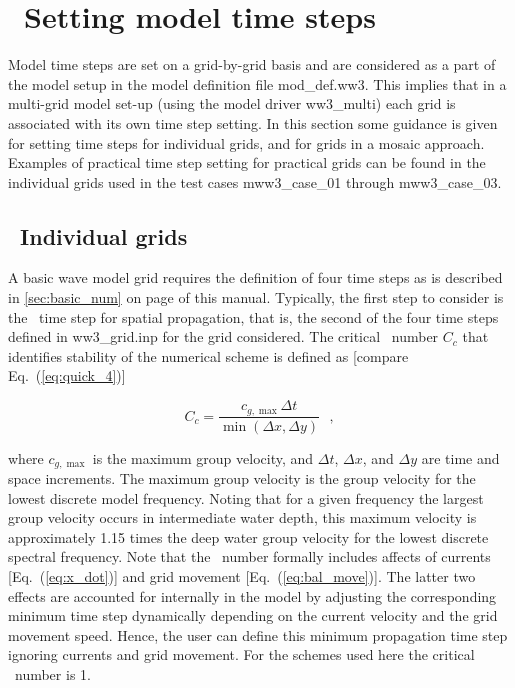 \pagestyle{myheadings} \setcounter{page}{1} \setcounter{footnote}{0}

\section{~Setting model time steps} \label{app:tstep}
\newcounters 
\vssub

Model time steps are set on a grid-by-grid basis and are considered as a part
of the model setup in the model definition file {\file mod\_def.ww3}. This
implies that in a multi-grid model set-up (using the model driver {\file
ww3\_multi}) each grid is associated with its own time step setting. In this
section some guidance is given for setting time steps for individual grids,
and for grids in a mosaic approach.  Examples of practical time step setting
for practical grids can be found in the individual grids used in the test
cases {\file mww3\_case\_01} through {\file mww3\_case\_03}.

\subsection{~Individual grids}

A basic wave model grid requires the definition of four time steps as is
described in \para\ref{sec:basic_num} on page \pageref{dt_list} of this
manual. Typically, the first step to consider is the \cfl\ time step for
spatial propagation, that is, the second of the four time steps defined in
{\file ww3\_grid.inp} for the grid considered. The critical \cfl\ number $C_c$
that identifies stability of the numerical scheme is defined as [compare
Eq.~(\ref{eq:quick_4})]

\begin{equation}
C_c = \frac{c_{g,\max} \Delta t}{\min(\Delta x , \Delta y)} \:\:\: , 
\label{eq:CFLmax}
\end{equation}

\noindent 
where $c_{g,\max}$ is the maximum group velocity, and $\Delta t$, $\Delta x$,
and $\Delta y$ are time and space increments. The maximum group velocity is
the group velocity for the lowest discrete model frequency. Noting that for a
given frequency the largest group velocity occurs in intermediate water depth,
this maximum velocity is approximately 1.15 times the deep water group
velocity for the lowest discrete spectral frequency. Note that the \cfl\
number formally includes affects of currents [Eq.~(\ref{eq:x_dot})] and grid
movement [Eq.~(\ref{eq:bal_move})]. The latter two effects are accounted for
internally in the model by adjusting the corresponding minimum time step
dynamically depending on the current velocity and the grid movement speed.
Hence, the user can define this minimum propagation time step ignoring
currents and grid movement. For the schemes used here the critical \cfl\
number is 1.

